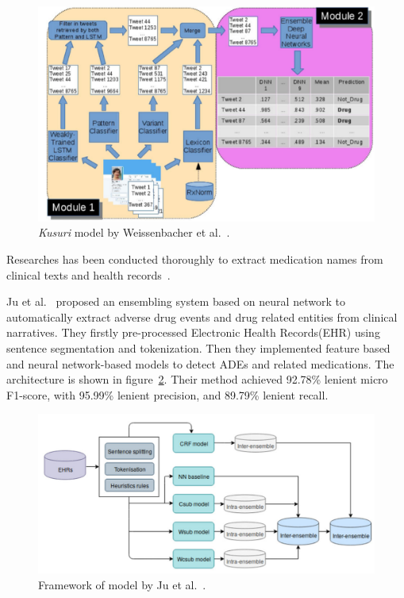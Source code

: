 \begin{figure}[h]
	\centering
	\includegraphics[width=0.99\linewidth]{Figures/a.png}
	\caption{\textit{Kusuri} model by Weissenbacher et al.~\cite{weissenbacher2019deep}.}
	\label{fig:architecture-weissenbacher}
\end{figure}

Researches has been conducted thoroughly to extract medication names from clinical texts and health records~\cite{weeks2020medextractr, kim2020ensemble, ju2020ensemble}.

Ju et al.~\cite{ju2020ensemble} proposed an ensembling system based on neural network to automatically extract adverse drug events and drug related entities from clinical narratives. They firstly pre-processed Electronic Health Records(EHR) using sentence segmentation and tokenization. Then they implemented feature based and neural network-based models to detect ADEs and related medications. The architecture is shown in figure~\ref{fig:architecture-ju}. Their method achieved 92.78\% lenient micro F1-score, with 95.99\% lenient precision, and 89.79\% lenient recall.

\begin{figure}[h]
	\centering
	\includegraphics[width=0.99\linewidth]{Figures/c.png}
	\caption{Framework of model by Ju et al.~\cite{ju2020ensemble}.}
	\label{fig:architecture-ju}
\end{figure}

